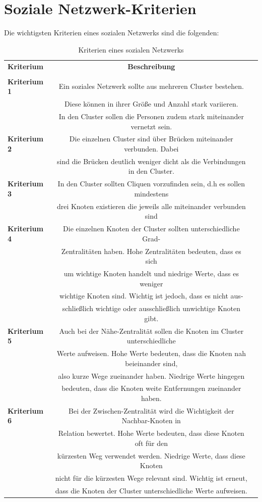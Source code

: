 \section{Soziale Netzwerk-Kriterien}
\label{ch:eigenschaftenTabelle}
Die wichtigsten Kriterien eines sozialen Netzwerks sind die folgenden: 
\begin{table}[h!]
\footnotesize
\caption{Kriterien eines sozialen Netzwerks}
\label{TableEigenschaften}
\begin{tabular}{lcc}\toprule 
\textbf{Kriterium} &\textbf{Beschreibung} \\
 &\\\midrule
  \textbf{Kriterium 1} & Ein soziales Netzwerk sollte aus mehreren Cluster bestehen. \\
  &Diese können in ihrer Größe und Anzahl stark variieren.   \\
  & In den Cluster sollen die Personen zudem stark miteinander vernetzt sein. 
  \\\midrule
  \textbf{Kriterium 2} & Die einzelnen Cluster sind über Brücken miteinander verbunden. Dabei \\
  & sind die Brücken deutlich weniger dicht als die Verbindungen in den Cluster. 
  \\\midrule
  \textbf{Kriterium 3} & In den Cluster sollten Cliquen vorzufinden sein, d.h es sollen mindestens \\
  & drei Knoten existieren die jeweils alle miteinander verbunden sind 
  \\\midrule
  \textbf{Kriterium 4} &  Die einzelnen Knoten der Cluster sollten unterschiedliche Grad-\\
  & Zentralitäten haben. Hohe Zentralitäten bedeuten, dass es sich \\
  & um wichtige Knoten handelt und niedrige Werte, dass es weniger \\ 
  & wichtige Knoten sind. Wichtig ist jedoch, dass es nicht aus-\\
  & schließlich wichtige oder ausschließlich unwichtige Knoten gibt.  
  \\\midrule
  \textbf{Kriterium 5} & Auch bei der Nähe-Zentralität sollen die Knoten im Cluster unterschiedliche \\ 
  & Werte aufweisen. Hohe Werte bedeuten, dass die Knoten nah beieinander sind, \\
  & also kurze Wege zueinander haben. Niedrige Werte hingegen \\
  & bedeuten, dass die Knoten weite Entfernungen zueinander haben.
  \\\midrule
  \textbf{Kriterium 6} & Bei der Zwischen-Zentralität wird die Wichtigkeit der Nachbar-Knoten in \\ 
  & Relation bewertet. Hohe Werte bedeuten, dass diese Knoten oft für den \\
  & kürzesten Weg verwendet werden. Niedrige Werte, dass diese Knoten \\ 
  & nicht für die kürzesten Wege relevant sind. Wichtig ist erneut, \\
  & dass die Knoten der Cluster unterschiedliche Werte aufweisen.
  

\end{tabular}
\end{table}
